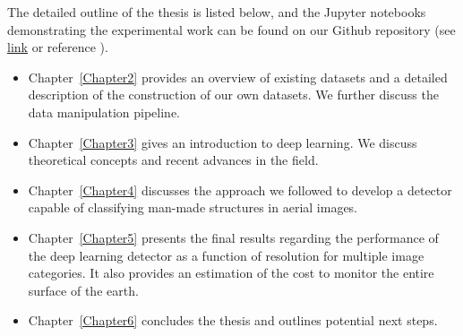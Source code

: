 The detailed outline of the thesis is listed below, and the Jupyter notebooks demonstrating the experimental work can be found on our Github repository (see \href{https://github.com/peterweber85/MasterThesis}{link} or reference \parencite{github}).
\begin{itemize}
	\item Chapter~\ref{Chapter2} provides an overview of existing datasets and a detailed description of the construction of our own datasets. We further discuss the data manipulation pipeline.
	
	\item Chapter~\ref{Chapter3} gives an introduction to deep learning. We discuss theoretical concepts and recent advances in the field.
	
	\item Chapter~\ref{Chapter4} discusses the approach we followed to develop a detector capable of classifying man-made structures in aerial images.
	
	\item Chapter~\ref{Chapter5} presents the final results regarding the performance of the deep learning detector as a function of resolution for multiple image categories. It also provides an estimation of the cost to monitor the entire surface of the earth.
	
	\item Chapter~\ref{Chapter6} concludes the thesis and outlines potential next steps.	
\end{itemize}	